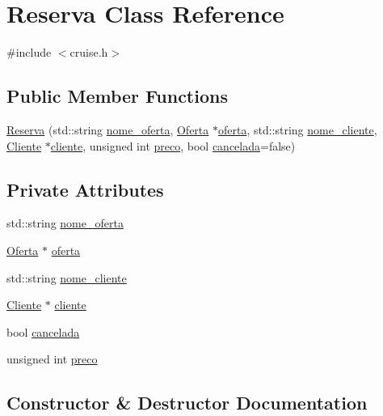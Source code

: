 \hypertarget{classReserva}{}\section{Reserva Class Reference}
\label{classReserva}


{\ttfamily \#include $<$cruise.\+h$>$}

\subsection*{Public Member Functions}
\begin{DoxyCompactItemize}
\item 
\hyperlink{classReserva_a9c29deadbcec8dfb5bfb2ecf18eab75b}{Reserva} (std\+::string \hyperlink{classReserva_a7cb648fed343e3c91e6596a6c30f729e}{nome\+\_\+oferta}, \hyperlink{classOferta}{Oferta} $\ast$\hyperlink{classReserva_a7e783c52d11f78b8a4b50f4de59e290b}{oferta}, std\+::string \hyperlink{classReserva_a2f2973c6da62a5533153325efa2d836d}{nome\+\_\+cliente}, \hyperlink{classCliente}{Cliente} $\ast$\hyperlink{classReserva_acc8b137ed21ce17aba40105e7e44bbb9}{cliente}, unsigned int \hyperlink{classReserva_afa645221f6e786e34c15dea5984133f6}{preco}, bool \hyperlink{classReserva_aab57a0212741492180a4ef8eeb340d4c}{cancelada}=false)
\end{DoxyCompactItemize}
\subsection*{Private Attributes}
\begin{DoxyCompactItemize}
\item 
std\+::string \hyperlink{classReserva_a7cb648fed343e3c91e6596a6c30f729e}{nome\+\_\+oferta}
\item 
\hyperlink{classOferta}{Oferta} $\ast$ \hyperlink{classReserva_a7e783c52d11f78b8a4b50f4de59e290b}{oferta}
\item 
std\+::string \hyperlink{classReserva_a2f2973c6da62a5533153325efa2d836d}{nome\+\_\+cliente}
\item 
\hyperlink{classCliente}{Cliente} $\ast$ \hyperlink{classReserva_acc8b137ed21ce17aba40105e7e44bbb9}{cliente}
\item 
bool \hyperlink{classReserva_aab57a0212741492180a4ef8eeb340d4c}{cancelada}
\item 
unsigned int \hyperlink{classReserva_afa645221f6e786e34c15dea5984133f6}{preco}
\end{DoxyCompactItemize}


\subsection{Constructor \& Destructor Documentation}
\mbox{\label{classReserva_a9c29deadbcec8dfb5bfb2ecf18eab75b}} 
